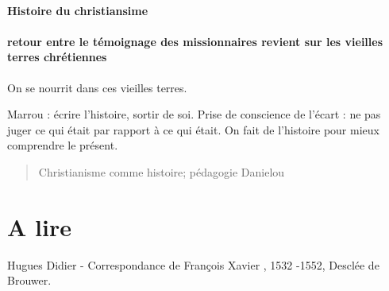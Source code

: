 \paragraph{Histoire du christiansime}

\paragraph{retour entre le témoignage des missionnaires revient sur les vieilles terres chrétiennes} On se nourrit dans ces vieilles terres.

Marrou : écrire l'histoire, sortir de soi. Prise de conscience de l'écart : ne pas juger ce qui était par rapport à ce qui était. On fait de l'histoire pour mieux comprendre le présent.
\begin{quote}
Christianisme comme histoire; pédagogie 
Danielou
\end{quote}

\section{A lire}

Hugues Didier - Correspondance de François Xavier , 1532 -1552, Desclée de Brouwer. 
